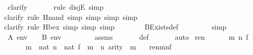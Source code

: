 \begin{isabellebody}
\ clarify\isanewline
\ \ \ \ \ \ \isamarkupfalse%
{\isacharparenleft}{\kern0pt}rule\ disjE{\isacharcomma}{\kern0pt}\ simp{\isacharparenright}{\kern0pt}\isanewline
\ \ \ \ \ \ \isamarkupfalse%
{\isacharparenleft}{\kern0pt}clarify{\isacharcomma}{\kern0pt}\ rule\ Hnand{\isacharcomma}{\kern0pt}\ simp{\isacharcomma}{\kern0pt}\ simp{\isacharcomma}{\kern0pt}\ simp{\isacharcomma}{\kern0pt}\ simp{\isacharparenright}{\kern0pt}\isanewline
\ \ \ \ \ \ \isamarkupfalse%
{\isacharparenleft}{\kern0pt}clarify{\isacharcomma}{\kern0pt}\ rule\ Hbex{\isacharcomma}{\kern0pt}\ simp{\isacharcomma}{\kern0pt}\ simp{\isacharcomma}{\kern0pt}\ simp{\isacharparenright}{\kern0pt}\isanewline
\ \ \ \ \ \ \isamarkupfalse%
\ BExists{\isacharprime}{\kern0pt}{\isacharunderscore}{\kern0pt}def\ \isanewline
\ \ \ \ \ \ \isamarkupfalse%
\ simp\isanewline
\ \ \isamarkupfalse%
\isanewline
\isanewline
\ \ \isamarkupfalse%
\ \isamarkupfalse%
\ {\isachardoublequoteopen}A{\isacharcomma}{\kern0pt}\ env\ {\isasymTurnstile}\ {\isasymphi}\ {\isasymlongleftrightarrow}\ B{\isacharcomma}{\kern0pt}\ env\ {\isasymTurnstile}\ {\isasymphi}{\isachardoublequoteclose}\ \isanewline
\ \ \ \ \isamarkupfalse%
\ assms\ \isanewline
\ \ \ \ \isamarkupfalse%
\ {\isasymDelta}{}{\isacharunderscore}{\kern0pt}def\ \isanewline
\ \ \ \ \isamarkupfalse%
\ auto\isanewline
{}\isamarkupfalse%
%
\endisatagproof
{\isafoldproof}%
%
\isadelimproof
\isanewline
%
\endisadelimproof
\isanewline
{}\isamarkupfalse%
\ ren{\isacharunderscore}{\kern0pt}{\isasymDelta}{}\ {\isacharcolon}{\kern0pt}\ \isanewline
\ \ \ {\isasymphi}\ m\ n\ f\isanewline
\ \ \ {\isachardoublequoteopen}{\isasymphi}\ {\isasymin}\ {\isasymDelta}{}{\isachardoublequoteclose}\ {\isachardoublequoteopen}m\ {\isasymin}\ nat{\isachardoublequoteclose}\ {\isachardoublequoteopen}n\ {\isasymin}\ nat{\isachardoublequoteclose}\ {\isachardoublequoteopen}f\ {\isasymin}\ m\ {\isasymrightarrow}\ n{\isachardoublequoteclose}\ {\isachardoublequoteopen}arity{\isacharparenleft}{\kern0pt}{\isasymphi}{\isacharparenright}{\kern0pt}\ {\isasymle}\ m{\isachardoublequoteclose}\isanewline
\ \ \ {\isachardoublequoteopen}ren{\isacharparenleft}{\kern0pt}{\isasymphi}{\isacharparenright}{\kern0pt}{\isacharbackquote}{\kern0pt}m{\isacharbackquote}{\kern0pt}n{\isacharbackquote}{\kern0pt}f\ {\isasymin}\ {\isasymDelta}{}{\isachardoublequoteclose}\ \isanewline

\end{isabellebody}
